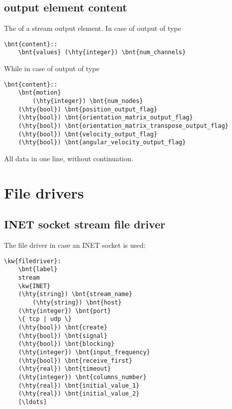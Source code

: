 \subsection{output element content}\label{sec:APP:LOGFILE:OUTPUT_ELEMENTS:CONTENT}
The  of a stream output element. In case of output of type
\begin{Verbatim}[commandchars=\\\{\}]
  \bnt{content}::
  	\bnt{values} (\hty{integer}) \bnt{num_channels}
\end{Verbatim}
While in case of output of type 
\begin{Verbatim}[commandchars=\\\{\}]
  \bnt{content}::
  	\bnt{motion} 
        (\hty{integer}) \bnt{num_nodes}
	(\hty{bool}) \bnt{position_output_flag} 
	(\hty{bool}) \bnt{orientation_matrix_output_flag} 
	(\hty{bool}) \bnt{orientation_matrix_transpose_output_flag} 
	(\hty{bool}) \bnt{velocity_output_flag} 
	(\hty{bool}) \bnt{angular_velocity_output_flag} 
\end{Verbatim}
All data in one line, without continuation.

\section{File drivers}

\subsection{INET socket stream file driver}
The  file driver in case an INET socket is used:
\begin{Verbatim}[commandchars=\\\{\}]
\kw{filedriver}: 
	\bnt{label}
	stream 
	\kw{INET}
	(\hty{string}) \bnt{stream_name}
        (\hty{string}) \bnt{host}
	(\hty{integer}) \bnt{port}
	\{ tcp | udp \}
	(\hty{bool}) \bnt{create}
	(\hty{bool}) \bnt{signal}
	(\hty{bool}) \bnt{blocking}
	(\hty{integer}) \bnt{input_frequency}
	(\hty{bool}) \bnt{receive_first}
	(\hty{real}) \bnt{timeout}
	(\hty{integer}) \bnt{columns_number}
	(\hty{real}) \bnt{initial_value_1}
	(\hty{real}) \bnt{initial_value_2}
	[\ldots]
\end{Verbatim}


